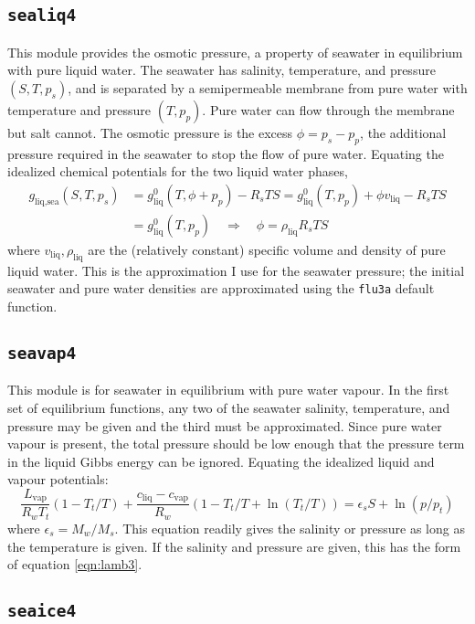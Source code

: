 \documentclass{article}
\newcommand{\liq}{\text{liq}}
\newcommand{\vap}{\text{vap}}
\newcommand{\sea}{\text{sea}}
\newcommand{\epss}{\epsilon_s}
\begin{document}
\subsection{\texttt{sealiq4}}

This module provides the osmotic pressure, a property of seawater in equilibrium with pure liquid water. The seawater has salinity, temperature, and pressure $(S,T,p_s)$, and is separated by a semipermeable membrane from pure water with temperature and pressure $(T,p_p)$. Pure water can flow through the membrane but salt cannot. The osmotic pressure is the excess $\phi = p_s-p_p$, the additional pressure required in the seawater to stop the flow of pure water. Equating the idealized chemical potentials for the two liquid water phases,
\begin{align*}
    g_{\liq,\sea}(S,T,p_s) &= g^0_{\liq}(T,\phi+p_p) - R_s T S = g^0_{\liq}(T,p_p) + \phi v_{\liq} - R_s T S \\
    &= g^0_{\liq}(T,p_p) \quad \Rightarrow \quad \phi = \rho_{\liq} R_s T S
\end{align*}
where $v_{\liq}, \rho_{\liq}$ are the (relatively constant) specific volume and density of pure liquid water. This is the approximation I use for the seawater pressure; the initial seawater and pure water densities are approximated using the \texttt{flu3a} default function.


\subsection{\texttt{seavap4}}

This module is for seawater in equilibrium with pure water vapour. In the first set of equilibrium functions, any two of the seawater salinity, temperature, and pressure may be given and the third must be approximated. Since pure water vapour is present, the total pressure should be low enough that the pressure term in the liquid Gibbs energy can be ignored. Equating the idealized liquid and vapour potentials:
\begin{equation*}
    \frac{L_{\vap}}{R_w T_t} (1 - T_t/T) + \frac{c_{\liq}-c_{\vap}}{R_w} (1 - T_t/T + \ln(T_t/T)) = \epss S + \ln(p/p_t)
\end{equation*}
where $\epss = M_w/M_s$. This equation readily gives the salinity or pressure as long as the temperature is given. If the salinity and pressure are given, this has the form of equation \ref{eqn:lamb3}.


\subsection{\texttt{seaice4}}
\end{document}
